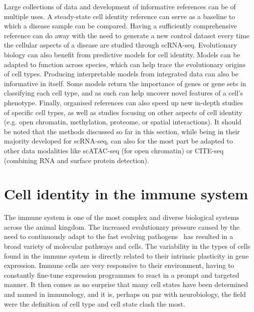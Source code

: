 Large collections of data and development of informative references can be of multiple uses. A steady-state cell identity reference can serve as a baseline to which a disease sample can be compared. Having a sufficiently comprehensive reference can do away with the need to generate a new control dataset every time the cellular aspects of a disease are studied through scRNA-seq. Evolutionary biology can also benefit from predictive models for cell identity. Models can be adapted to function across species, which can help trace the evolutionary origins of cell types. Producing interpretable models from integrated data can also be informative in itself. Some models return the importance of genes or gene sets in classifying each cell type, and as such can help uncover novel features of a cell's phenotype. Finally, organised references can also speed up new in-depth studies of specific cell types, as well as studies focusing on other aspects of cell identity (e.g. open chromatin, methylation, proteome, or spatial interactions). It should be noted that the methods discussed so far in this section, while being in their majority developed for scRNA-seq, can also for the most part be adapted to other data modalities like scATAC-seq (for open chromatin) or CITE-seq (combining RNA and surface protein detection).



\section{Cell identity in the immune system}  %
\label{section1.4}

The immune system is one of the most complex and diverse biological systems across the animal kingdom. The increased evolutionary pressure caused by the need to continuously adapt to the fast evolving pathogens~\citep{barreiro_evolutionary_2010} has resulted in a broad variety of molecular pathways and cells. The variability in the types of cells found in the immune system is directly related to their intrinsic plasticity in gene expression. Immune cells are very responsive to their environment, having to constantly fine-tune expression programmes to react in a prompt and targeted manner. It then comes as no surprise that many cell states have been determined and named in immunology, and it is, perhaps on par with neurobiology, the field were the definition of cell type and cell state clash the most. 

